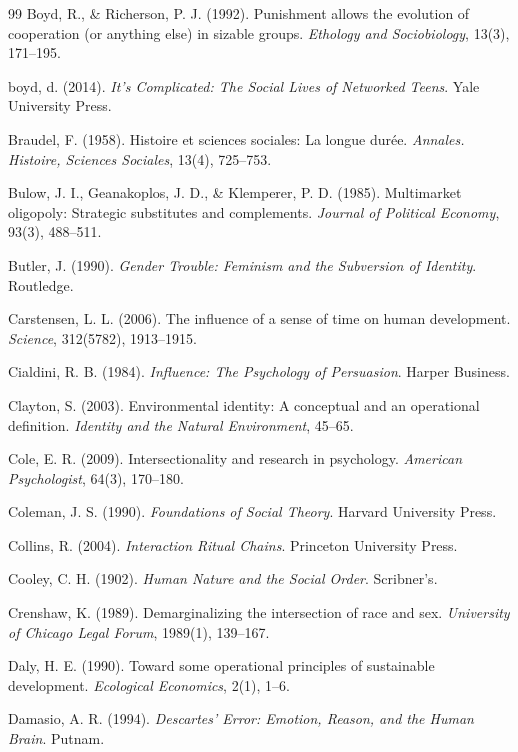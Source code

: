 \begin{thebibliography}{99}
Boyd, R., \& Richerson, P. J. (1992).
Punishment allows the evolution of cooperation (or anything else) in sizable groups.
\textit{Ethology and Sociobiology}, 13(3), 171--195.

boyd, d. (2014).
\textit{It's Complicated: The Social Lives of Networked Teens}.
Yale University Press.

Braudel, F. (1958).
Histoire et sciences sociales: La longue durée.
\textit{Annales. Histoire, Sciences Sociales}, 13(4), 725--753.

Bulow, J. I., Geanakoplos, J. D., \& Klemperer, P. D. (1985).
Multimarket oligopoly: Strategic substitutes and complements.
\textit{Journal of Political Economy}, 93(3), 488--511.

Butler, J. (1990).
\textit{Gender Trouble: Feminism and the Subversion of Identity}.
Routledge.

Carstensen, L. L. (2006).
The influence of a sense of time on human development.
\textit{Science}, 312(5782), 1913--1915.

Cialdini, R. B. (1984).
\textit{Influence: The Psychology of Persuasion}.
Harper Business.

Clayton, S. (2003).
Environmental identity: A conceptual and an operational definition.
\textit{Identity and the Natural Environment}, 45--65.

Cole, E. R. (2009).
Intersectionality and research in psychology.
\textit{American Psychologist}, 64(3), 170--180.

Coleman, J. S. (1990).
\textit{Foundations of Social Theory}.
Harvard University Press.

Collins, R. (2004).
\textit{Interaction Ritual Chains}.
Princeton University Press.

Cooley, C. H. (1902).
\textit{Human Nature and the Social Order}.
Scribner's.

Crenshaw, K. (1989).
Demarginalizing the intersection of race and sex.
\textit{University of Chicago Legal Forum}, 1989(1), 139--167.

Daly, H. E. (1990).
Toward some operational principles of sustainable development.
\textit{Ecological Economics}, 2(1), 1--6.

Damasio, A. R. (1994).
\textit{Descartes' Error: Emotion, Reason, and the Human Brain}.
Putnam.


\end{thebibliography}
